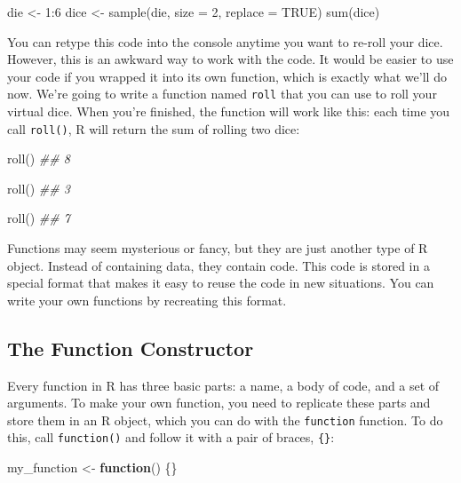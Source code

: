 \documentclass[
  letterpaper,
  DIV=11,
  numbers=noendperiod]{scrbook}
\newenvironment{Shaded}{\begin{snugshade}}{\end{snugshade}}
\newcommand{\AttributeTok}[1]{\textcolor[rgb]{0.40,0.45,0.13}{#1}}
\newcommand{\ConstantTok}[1]{\textcolor[rgb]{0.56,0.35,0.01}{#1}}
\newcommand{\ControlFlowTok}[1]{\textcolor[rgb]{0.00,0.23,0.31}{\textbf{#1}}}
\newcommand{\DecValTok}[1]{\textcolor[rgb]{0.68,0.00,0.00}{#1}}
\newcommand{\DocumentationTok}[1]{\textcolor[rgb]{0.37,0.37,0.37}{\textit{#1}}}
\newcommand{\FunctionTok}[1]{\textcolor[rgb]{0.28,0.35,0.67}{#1}}
\newcommand{\NormalTok}[1]{\textcolor[rgb]{0.00,0.23,0.31}{#1}}
\newcommand{\OtherTok}[1]{\textcolor[rgb]{0.00,0.23,0.31}{#1}}
\newcommand{\SpecialCharTok}[1]{\textcolor[rgb]{0.37,0.37,0.37}{#1}}
\begin{document}
\begin{Shaded}
\begin{Highlighting}[]
\NormalTok{die }\OtherTok{\textless{}{-}} \DecValTok{1}\SpecialCharTok{:}\DecValTok{6}
\NormalTok{dice }\OtherTok{\textless{}{-}} \FunctionTok{sample}\NormalTok{(die, }\AttributeTok{size =} \DecValTok{2}\NormalTok{, }\AttributeTok{replace =} \ConstantTok{TRUE}\NormalTok{)}
\FunctionTok{sum}\NormalTok{(dice)}
\end{Highlighting}
\end{Shaded}

You can retype this code into the console anytime you want to re-roll
your dice. However, this is an awkward way to work with the code. It
would be easier to use your code if you wrapped it into its own
function, which is exactly what we'll do now. We're going to write a
function named \texttt{roll} that you can use to roll your virtual dice.
When you're finished, the function will work like this: each time you
call \texttt{roll()}, R will return the sum of rolling two dice:

\begin{Shaded}
\begin{Highlighting}[]
\FunctionTok{roll}\NormalTok{()}
\DocumentationTok{\#\# 8 }

\FunctionTok{roll}\NormalTok{()}
\DocumentationTok{\#\# 3}

\FunctionTok{roll}\NormalTok{()}
\DocumentationTok{\#\# 7}
\end{Highlighting}
\end{Shaded}

Functions may seem mysterious or fancy, but they are just another type
of R object. Instead of containing data, they contain code. This code is
stored in a special format that makes it easy to reuse the code in new
situations. You can write your own functions by recreating this format.

\subsection{The Function Constructor}\label{the-function-constructor}

Every function in R has three basic parts: a name, a body of code, and a
set of arguments. To make your own function, you need to replicate these
parts and store them in an R object, which you can do with the
\texttt{function} function. To do this, call \texttt{function()} and
follow it with a pair of braces, \texttt{\{\}}:

\begin{Shaded}
\begin{Highlighting}[]
\NormalTok{my\_function }\OtherTok{\textless{}{-}} \ControlFlowTok{function}\NormalTok{() \{\}}
\end{Highlighting}
\end{Shaded}
\end{document}
